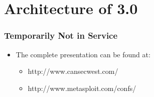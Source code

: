 \documentclass{beamer}
\newenvironment{sitemize}{\vspace{1mm}\begin{itemize}\itemsep 4pt\small}{\end{itemize}}
\begin{document}
\section{Architecture of 3.0}
\begin{frame}[t]
  \frametitle{Temporarily Not in Service}
  
  \begin{sitemize}
    \item The complete presentation can be found at:
	\begin{sitemize}
		\item http://www.cansecwest.com/
		\item http://www.metasploit.com/confs/
	\end{sitemize}
  \end{sitemize}
  
\end{frame}
\end{document}
